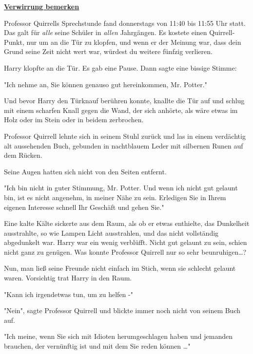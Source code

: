 

\hypertarget{verwirrung-bemerken}{%

\textbf{\uline{Verwirrung bemerken}}

Professor Quirrells Sprechstunde fand donnerstags von 11:40 bis 11:55 Uhr statt. Das galt für \emph{alle} seine Schüler in \emph{allen} Jahrgängen. Es kostete einen Quirrell-Punkt, nur um an die Tür zu klopfen, und wenn er der Meinung war, dass dein Grund seine Zeit nicht wert war, würdest du weitere fünfzig verlieren.

Harry klopfte an die Tür. Es gab eine Pause. Dann sagte eine bissige Stimme:

"Ich nehme an, Sie können genauso gut hereinkommen, Mr. Potter."

Und bevor Harry den Türknauf berühren konnte, knallte die Tür auf und schlug mit einem scharfen Knall gegen die Wand, der sich anhörte, als wäre etwas im Holz oder im Stein oder in beidem zerbrochen.

Professor Quirrell lehnte sich in seinem Stuhl zurück und las in einem verdächtig alt aussehenden Buch, gebunden in nachtblauem Leder mit silbernen Runen auf dem Rücken.

Seine Augen hatten sich nicht von den Seiten entfernt.

"Ich bin nicht in guter Stimmung, Mr. Potter. Und wenn ich nicht gut gelaunt bin, ist es nicht angenehm, in meiner Nähe zu sein. Erledigen Sie in Ihrem eigenen Interesse schnell Ihr Geschäft und gehen Sie."

Eine kalte Kälte sickerte aus dem Raum, als ob er etwas enthielte, das Dunkelheit ausstrahlte, so wie Lampen Licht ausstrahlen, und das nicht vollständig abgedunkelt war. Harry war ein wenig verblüfft. Nicht gut gelaunt zu sein, schien nicht ganz zu genügen. Was konnte Professor Quirrell nur so sehr beunruhigen…?

Nun, man ließ seine Freunde nicht einfach im Stich, wenn sie schlecht gelaunt waren. Vorsichtig trat Harry in den Raum.

"Kann ich irgendetwas tun, um zu helfen -"

"Nein", sagte Professor Quirrell und blickte immer noch nicht von seinem Buch auf.

"Ich meine, wenn Sie sich mit Idioten herumgeschlagen haben und jemanden brauchen, der vernünftig ist und mit dem Sie reden können …"

}
